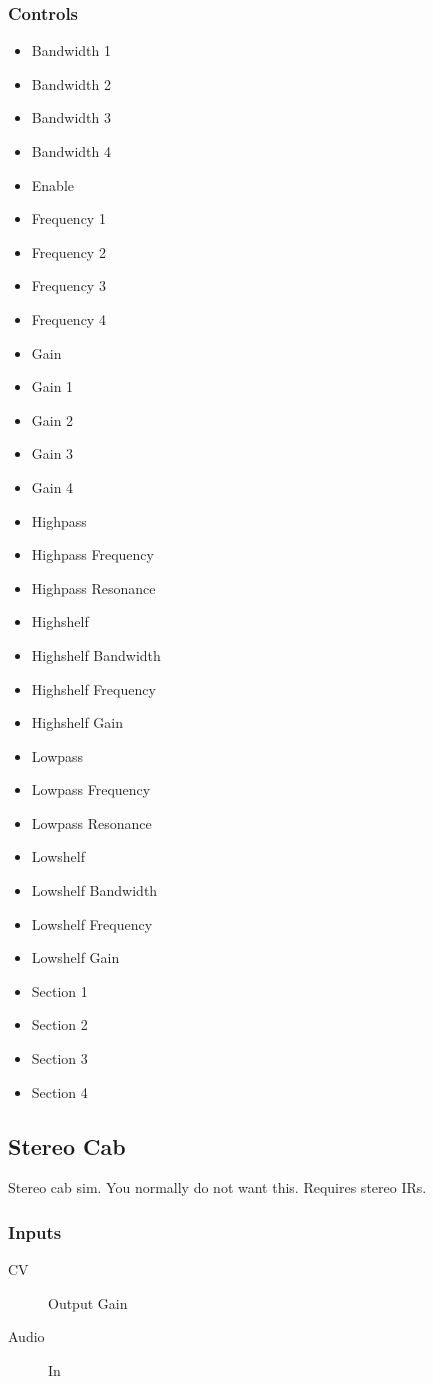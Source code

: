 \subsubsection{Controls}
\begin{itemize}
\item Bandwidth 1
\item Bandwidth 2
\item Bandwidth 3
\item Bandwidth 4
\item Enable
\item Frequency 1
\item Frequency 2
\item Frequency 3
\item Frequency 4
\item Gain
\item Gain 1
\item Gain 2
\item Gain 3
\item Gain 4
\item Highpass
\item Highpass Frequency
\item Highpass Resonance
\item Highshelf
\item Highshelf Bandwidth
\item Highshelf Frequency
\item Highshelf Gain
\item Lowpass
\item Lowpass Frequency
\item Lowpass Resonance
\item Lowshelf
\item Lowshelf Bandwidth
\item Lowshelf Frequency
\item Lowshelf Gain
\item Section 1
\item Section 2
\item Section 3
\item Section 4
\end{itemize}

\subsection{Stereo Cab}

Stereo cab sim. You normally do not want this. Requires stereo IRs.



\subsubsection{Inputs}
\begin{description}
\item [CV] Output Gain
\item [Audio] In
\end{description}

